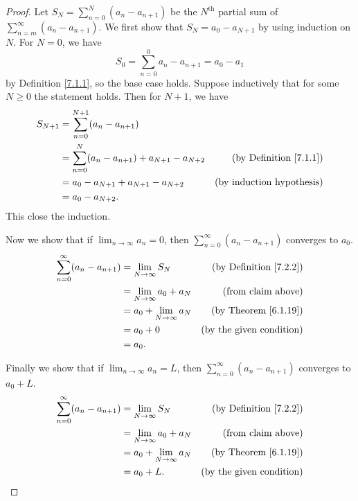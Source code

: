 \begin{proof}
    Let \(S_N = \sum_{n = 0}^N (a_n - a_{n + 1})\) be the \(N^{\text{th}}\) partial sum of \(\sum_{n = m}^\infty (a_n - a_{n + 1})\).
    We first show that \(S_N = a_0 - a_{N + 1}\) by using induction on \(N\).
    For \(N = 0\), we have
    \[
        S_0 = \sum_{n = 0}^0 a_n - a_{n + 1} = a_0 - a_1
    \]
    by Definition \ref{7.1.1}, so the base case holds.
    Suppose inductively that for some \(N \geq 0\) the statement holds.
    Then for \(N + 1\), we have
    \begin{align*}
        S_{N + 1} & = \sum_{n = 0}^{N + 1} (a_n - a_{n + 1})                                                        \\
                  & = \sum_{n = 0}^N (a_n - a_{n + 1}) + a_{N + 1} - a_{N + 2} & \text{(by Definition \ref{7.1.1})} \\
                  & = a_0 - a_{N + 1} + a_{N + 1} - a_{N + 2}                  & \text{(by induction hypothesis)}   \\
                  & = a_0 - a_{N + 2}.
    \end{align*}
    This close the induction.

    Now we show that if \(\lim_{n \to \infty} a_n = 0\), then \(\sum_{n = 0}^\infty (a_n - a_{n + 1})\) converges to \(a_0\).
    \begin{align*}
        \sum_{n = 0}^\infty (a_n - a_{n + 1}) & = \lim_{N \to \infty} S_N       & \text{(by Definition \ref{7.2.2})} \\
                                              & = \lim_{N \to \infty} a_0 + a_N & \text{(from claim above)}          \\
                                              & = a_0 + \lim_{N \to \infty} a_N & \text{(by Theorem \ref{6.1.19})}   \\
                                              & = a_0 + 0                       & \text{(by the given condition)}    \\
                                              & = a_0.
    \end{align*}

    Finally we show that if \(\lim_{n \to \infty} a_n = L\), then \(\sum_{n = 0}^\infty (a_n - a_{n + 1})\) converges to \(a_0 + L\).
    \begin{align*}
        \sum_{n = 0}^\infty (a_n - a_{n + 1}) & = \lim_{N \to \infty} S_N       & \text{(by Definition \ref{7.2.2})} \\
                                              & = \lim_{N \to \infty} a_0 + a_N & \text{(from claim above)}          \\
                                              & = a_0 + \lim_{N \to \infty} a_N & \text{(by Theorem \ref{6.1.19})}   \\
                                              & = a_0 + L.                      & \text{(by the given condition)}
    \end{align*}
\end{proof}

